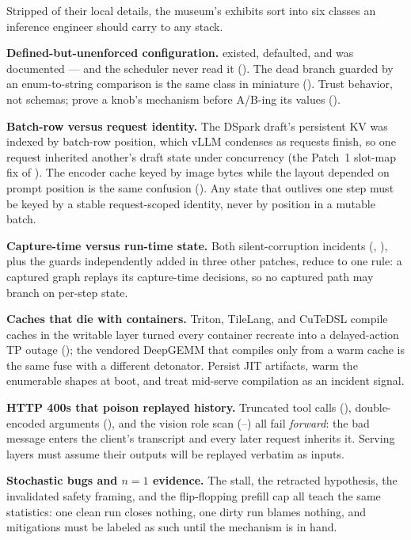 Stripped of their local details, the museum's exhibits sort into six classes
an inference engineer should carry to any stack.

\textbf{Defined-but-unenforced configuration.} 
existed, defaulted, and was documented --- and the scheduler never read it
(). The dead  branch guarded by an
enum-to-string comparison is the same class in miniature (). Trust
behavior, not schemas; prove a knob's mechanism before A/B-ing its values
().

\textbf{Batch-row versus request identity.} The DSpark draft's persistent KV
was indexed by batch-row position, which vLLM condenses as requests finish, so
one request inherited another's draft state under concurrency (the
Patch~1 slot-map fix of ). The encoder cache keyed by image
bytes while the layout depended on prompt position is the same confusion
(). Any state that outlives one step must be keyed by a stable
request-scoped identity, never by position in a mutable batch.

\textbf{Capture-time versus run-time state.} Both silent-corruption incidents
(, ), plus the guards independently added in
three other patches, reduce to one rule: a captured graph replays its
capture-time decisions, so no captured path may branch on per-step state.

\textbf{Caches that die with containers.} Triton, TileLang, and CuTeDSL
compile caches in the writable layer turned every container recreate into a
delayed-action TP outage (); the vendored DeepGEMM that compiles
only from a warm cache is the same fuse with a different detonator. Persist
JIT artifacts, warm the enumerable shapes at boot, and treat mid-serve
compilation as an incident signal.

\textbf{HTTP 400s that poison replayed history.} Truncated tool calls
(), double-encoded arguments (), and the vision role
scan (--) all fail \emph{forward}: the bad message
enters the client's transcript and every later request inherits it. Serving
layers must assume their outputs will be replayed verbatim as inputs.

\textbf{Stochastic bugs and $n{=}1$ evidence.} The  stall, the
retracted  hypothesis, the invalidated
 safety framing, and the flip-flopping prefill cap all
teach the same statistics: one clean run closes nothing, one dirty run blames
nothing, and mitigations must be labeled as such until the mechanism is in
hand.

